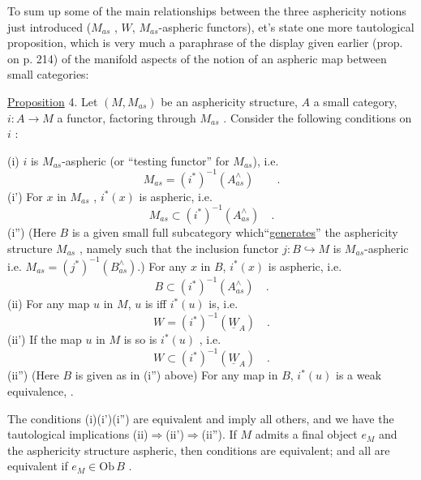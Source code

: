 
To sum up some of the main relationships between the three asphericity
notions just introduced ($M_{as}$ , $W$, $M_{as}$-aspheric functors), et's state
one more tautological proposition, which is very much a paraphrase of
the display given earlier (prop. on p. 214) of the manifold aspects of
the notion of an aspheric map between small categories:

\uline{Proposition} 4. Let $(M,M_{as})$ be an asphericity structure, $A$ a small
category, $i\colon A\to M$ a functor, factoring through $M_{as}$ . Consider the
following conditions on $i$ :

(i) $i$ is $M_{as}$-aspheric (or  ``testing functor'' for $M_{as}$), i.e. 
\[ M_{as} = (i^{*})^{-1}(A^{\wedge}_{as}) \qquad . \]
(i') For $x$ in $M_{as}$ , $i^{*}(x)$ is aspheric, i.e.
\[ M_{as} \subset (i^{*})^{-1}(A^{\wedge}_{as}) \quad . \]
(i'') (Here $B$ is a given small full subcategory  which``\uline{generates}'' the
asphericity structure $M_{as}$ , namely such that the inclusion functor
$j\colon B\hookrightarrow M$ is $M_{as}$-aspheric i.e. $M_{as} = (j^{*})^{-1}(B^{\wedge}_{as})$.) For any $x$ in $B$,
$i^{*}(x)$ is aspheric, i.e.
\[ B \subset (i^{*})^{-1}(A^{\wedge}_{as}) \quad . \]
(ii) For any map $u$ in $M$, $u$ is   iff $i^{*}(u)$ is, i.e.
\[ W = (i^{*})^{-1}(\underline{W}_{A}) \quad . \]
(ii') If the map $u$ in $M$ is   so is $i^{*}(u)$ , i.e.
\[ W \subset (i^{*})^{-1}(\underline{W}_{A}) \quad . \]
(ii'') (Here $B$ is given as in (i'') above) For any map  in $B$, $i^{*}(u)$
is a weak equivalence, . 

 The conditions (i)(i')(i'') are equivalent and imply all others, and
we have the tautological implications (ii)$\Rightarrow$(ii')$\Rightarrow$(ii''). If $M$ admits
a final object $e_M$ and \inserted[if A and]{} the asphericity structure   \inserted[are]{} aspheric, then  
\inserted[six]{}  conditions  are equivalent; and all  are equivalent if \inserted[moreover]{}  $e_M \in \mathrm{Ob}\, B$ .

